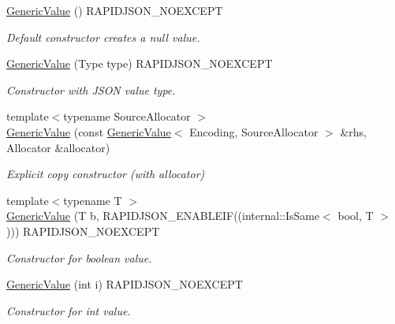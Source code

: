 \begin{DoxyCompactItemize}
\hyperlink{classGenericValue_ab0205d57176d83814ea4e4598c596fe8}{Generic\+Value} () R\+A\+P\+I\+D\+J\+S\+O\+N\+\_\+\+N\+O\+E\+X\+C\+E\+PT
\begin{DoxyCompactList}\small\item\em Default constructor creates a null value. \end{DoxyCompactList}\item 
\hyperlink{classGenericValue_a83c8f84b8e61f2f40414b703b75aea61}{Generic\+Value} (Type type) R\+A\+P\+I\+D\+J\+S\+O\+N\+\_\+\+N\+O\+E\+X\+C\+E\+PT
\begin{DoxyCompactList}\small\item\em Constructor with J\+S\+ON value type. \end{DoxyCompactList}\item 
{\footnotesize template$<$typename Source\+Allocator $>$ }\\\hyperlink{classGenericValue_a5161c0c98ba9144c50a38acde28a5ede}{Generic\+Value} (const \hyperlink{classGenericValue}{Generic\+Value}$<$ Encoding, Source\+Allocator $>$ \&rhs, Allocator \&allocator)
\begin{DoxyCompactList}\small\item\em Explicit copy constructor (with allocator) \end{DoxyCompactList}\item 
{\footnotesize template$<$typename T $>$ }\\\hyperlink{classGenericValue_a0f6a0394bfffaedde88e433b2265194c}{Generic\+Value} (T b, R\+A\+P\+I\+D\+J\+S\+O\+N\+\_\+\+E\+N\+A\+B\+L\+E\+IF((internal\+::\+Is\+Same$<$ bool, T $>$))) R\+A\+P\+I\+D\+J\+S\+O\+N\+\_\+\+N\+O\+E\+X\+C\+E\+PT
\begin{DoxyCompactList}\small\item\em Constructor for boolean value. \end{DoxyCompactList}\item 
\mbox{\label{classGenericValue_aafc754ade38421c179f5c8933ecbaf45}} 
\hyperlink{classGenericValue_aafc754ade38421c179f5c8933ecbaf45}{Generic\+Value} (int i) R\+A\+P\+I\+D\+J\+S\+O\+N\+\_\+\+N\+O\+E\+X\+C\+E\+PT
\begin{DoxyCompactList}\small\item\em Constructor for int value. \end{DoxyCompactList}\item 
\mbox{\label{classGenericValue_a972bff6c56ac3d04622ff7fad8d98331}} 

\end{DoxyCompactItemize}
